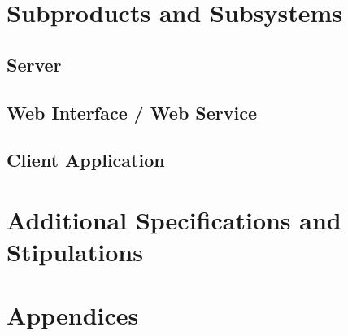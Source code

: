\documentclass[11pt,a4paper,oneside,svgnames]{report}
\begin{document}
\chapter{Subproducts and Subsystems}
\section{Server}
\section{Web Interface / Web Service}
\section{Client Application}

\chapter{Additional Specifications and Stipulations}
\chapter{Appendices}
\printglossaries
\end{document}
